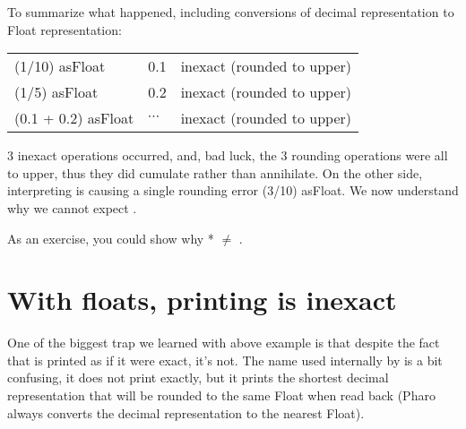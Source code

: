 \documentclass[a4paper,10pt,twoside]{book}
\begin{document}
To summarize what happened, including conversions of decimal representation to Float representation:\\
\begin{tabular}{lll}
(1/10) asFloat & 0.1 & inexact (rounded to upper) \\
(1/5) asFloat & 0.2 & inexact (rounded to upper) \\
(0.1 + 0.2) asFloat & $\cdots$ & inexact (rounded to upper)  \\
\end{tabular}

3 inexact operations occurred, and, bad luck, the 3 rounding operations were all to upper, thus they did cumulate rather than annihilate.
On the other side, interpreting  is causing a single rounding error (3/10) asFloat.
We now understand why we cannot expect .

As an exercise, you could show why  *   $\neq$ .


\section{With floats, printing is inexact}

One of the biggest trap we learned with above example is that despite the fact that  is printed  as if it were exact, it's not.
The name  used internally by  is a bit confusing, it does not print exactly,
but it prints the shortest decimal representation that will be rounded
to the same Float when read back (Pharo always converts the decimal representation to the nearest Float).
\end{document}
